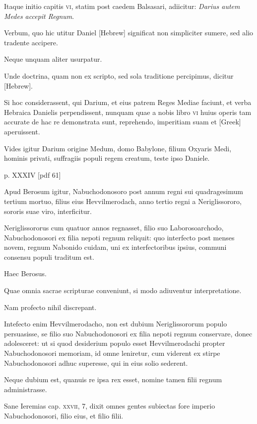 \begin{parnumbers}
Itaque initio capitis \textsc{vi}, statim post caedem Balsasari,
adiicitur: \textit{Darius autem Medes accepit Regnum}.

Verbum,
quo hic utitur Daniel \texthebrew{[Hebrew]}
 significat non simpliciter sumere, sed
alio tradente accipere.

Neque unquam aliter usurpatur.

Unde doctrina,
quam non ex scripto, sed sola traditione percipimus, dicitur
\texthebrew{[Hebrew]}.

Si hoc considerassent, qui Darium, et eius patrem Reges
Mediae faciunt, et verba Hebraica Danielis perpendissent,
nunquam quae a nobis libro \textsc{vi} huius operis tam accurate de hac
re demonstrata sunt, reprehendo, imperitiam suam et \textgreek{[Greek]}
aperuissent.

Vides igitur Darium origine Medum, domo Babylone,
filium Oxyaris Medi, hominis privati, suffragiis populi regem
creatum, teste ipso Daniele.

\clearpage
p. XXXIV [pdf 61]

Apud Berosum igitur, Nabuchodonosoro
post annum regni sui quadragesimum tertium mortuo, filius
eius Hevvilmerodach, anno tertio regni a Neriglissororo, sororis
suae viro, interficitur.

Neriglissororus cum quatuor annos regnasset,
filio suo Laborosoarchodo, Nabuchodonosori ex filia nepoti
regnum reliquit: quo interfecto post menses novem, regnum Nabonido
cuidam, uni ex interfectoribus ipsius, communi consensu
populi traditum est.

Haec Berosus.

Quae omnia sacrae scripturae conveniunt,
si modo adiuventur interpretatione.

Nam profecto nihil
discrepant.

Intefecto enim Hevvilmerodacho, non est dubium
Neriglissororum populo persuasisse, se filio suo Nabuchodonosori
ex filia nepoti regnum conservare, donec adolesceret: ut si quod
desiderium populo esset Hevvilmerodachi propter Nabuchodonosori
memoriam, id omne leniretur, cum viderent ex stirpe Nabuchodonosori
adhuc superesse, qui in eius solio sederent.

Neque dubium est, quanuis re ipsa rex esset, nomine tamen filii regnum
administrasse.

Sane Ieremias cap. \textsc{xxvii}, 7, dixit omnes gentes subiectas
fore imperio Nabuchodonosori, filio eius, et filio filii.


\end{parnumbers}
